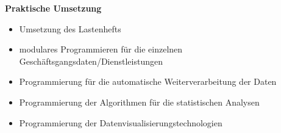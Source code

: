 \documentclass[10pt,a4paper,twocolumn,conference]{IEEEtran}
\begin{document}
\textbf{Praktische Umsetzung}\\
\begin{itemize}
    \item Umsetzung des Lastenhefts
    \item modulares Programmieren für die einzelnen Geschäftsgangsdaten/Dienstleistungen
    \item Programmierung für die automatische Weiterverarbeitung der Daten
    \item Programmierung der Algorithmen für die statistischen Analysen
    \item Programmierung der Datenvisualisierungstechnologien
\end{itemize}
\begin{comment}
\section{Abriß}
Ein grober Abriß der Masterarbeit bezüglich des Inhaltes und des Umfangs ist
unten stehend angegeben:\\
\textit{Einführung (ca. 5 S.)}:\\Tool mit dem man Suchergebnisse visualisieren kann\\
Tool für die kontrollierte Bestandsentwicklung\\Übersicht über die Kapitel - 1-
4 Sätze\\
\textit{Schluß (ca. 5 S.)}:\\
Resultat\\
Zusammenfassung\\
zukünftige Forschungfragen
\end{comment}            

 
\end{document}
